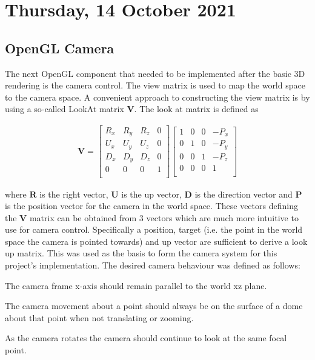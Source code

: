 \pendsign

\section[2021/10/14]{Thursday, 14 October 2021}

\subsection{OpenGL Camera}

The next OpenGL component that needed to be implemented after the basic 3D rendering is the camera control. The view matrix is used to map the world space to the camera space. A convenient approach to constructing the view matrix is by using a so-called LookAt matrix $\boldsymbol{V}$. The look at matrix is defined as

\begin{align}
	\boldsymbol{V}=
	\begin{bmatrix}
		R_x & R_y & R_z & 0 \\
		U_x & U_y & U_z & 0 \\
		D_x & D_y & D_z & 0 \\
		0 & 0 & 0 & 1 \\
	\end{bmatrix}
	\begin{bmatrix}
		1 & 0 & 0 & -P_x \\
		0 & 1 & 0 & -P_y \\
		0 & 0 & 1 & -P_z \\
		0 & 0 & 0 & 1 \\
	\end{bmatrix}
\end{align}

where $\boldsymbol{R}$ is the right vector, $\boldsymbol{U}$ is the up vector, $\boldsymbol{D}$ is the direction vector and $\boldsymbol{P}$ is the position vector for the camera in the world space. These vectors defining the $\boldsymbol{V}$ matrix can be obtained from 3 vectors which are much more intuitive to use for camera control. Specifically a position, target (i.e. the point in the world space the camera is pointed towards) and up vector are sufficient to derive a look up matrix. This was used as the basis to form the camera system for this project's implementation. The desired camera behaviour was defined as follows:

\begin{compactitem}
	\item The camera frame x-axis should remain parallel to the world xz plane.
	\item The camera movement about a point should always be on the surface of a dome about that point when not translating or zooming.
	\item As the camera rotates the camera should continue to look at the same focal point.
\end{compactitem}

